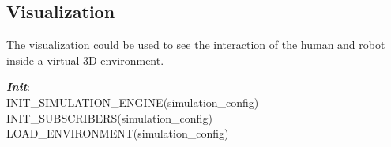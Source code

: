 \subsection{Visualization} The visualization could be used to see the interaction of the human and robot inside a virtual 3D environment.
\begin{algorithm}
 \textbf{\emph{Init}}:\\
 \quad INIT\_SIMULATION\_ENGINE(simulation\_config) \;
 \quad INIT\_SUBSCRIBERS(simulation\_config) \;
 \quad LOAD\_ENVIRONMENT(simulation\_config) \; 
\end{algorithm}


